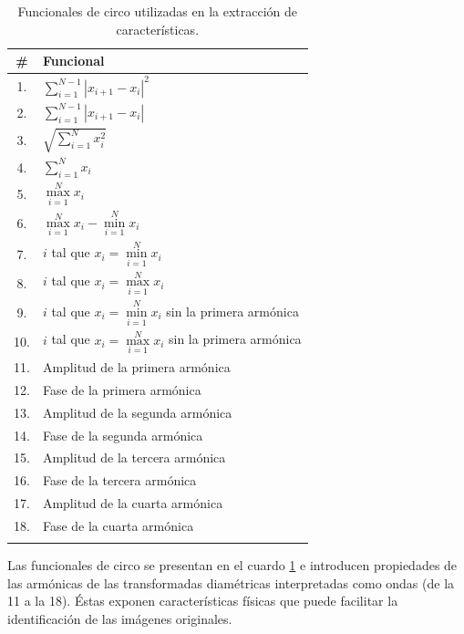 \begin{longtable}{ |c|l| }
        
        \hline
        \textbf{\#} & \textbf{Funcional} \\
        \hline
        \endhead
        
        1.&$\sum \limits_{i=1}^{N-1}{|x_{i+1}-x_{i}|^2}$\\ \hline
    2.&$\sum \limits_{i=1}^{N-1}{|x_{i+1}-x_{i}|}$\\ \hline
    3.&$\sqrt{\sum \limits_{i=1}^{N}{x_i^2}}$ \\ \hline
    4.&$\sum \limits_{i=1}^{N}{x_i}$ \\ \hline
    5.&$\max \limits_{i=1}^{N}{x_i}$ \\ \hline
    6.&$\max \limits_{i=1}^{N}{x_i}-\min \limits_{i=1}^{N}{x_i}$ \\ \hline
    7.&$i$ tal que $x_i=\min \limits_{i=1}^{N}{x_i}$ \\ \hline
    8.&$i$ tal que $x_i=\max \limits_{i=1}^{N}{x_i}$ \\ \hline
    9.&$i$ tal que $x_i=\min \limits_{i=1}^{N}{x_i}$ sin la primera armónica \\ \hline
    10.&$i$ tal que $x_i=\max \limits_{i=1}^{N}{x_i}$ sin la primera armónica \\ \hline
    11.&Amplitud de la primera armónica \\ \hline
    12.&Fase de la primera armónica \\ \hline
    13.&Amplitud de la segunda armónica \\ \hline
    14.&Fase de la segunda armónica \\ \hline
    15.&Amplitud de la tercera armónica \\ \hline
    16.&Fase de la tercera armónica \\ \hline
    17.&Amplitud de la cuarta armónica \\ \hline
    18.&Fase de la cuarta armónica \\ \hline
    
            
    \caption{Funcionales de circo utilizadas en la extracción de características.}
    \label{tab:fc}
\end{longtable}

Las funcionales de circo se presentan en el cuardo \ref{tab:fc} e introducen propiedades de las armónicas de las transformadas diamétricas interpretadas como ondas (de la 11 a la 18). Éstas exponen características físicas que puede facilitar la identificación de las imágenes originales.

